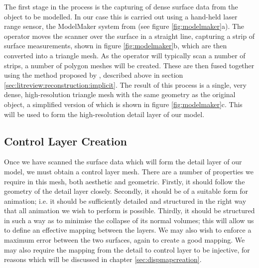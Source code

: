 The first stage in the process is the capturing of dense surface data from the object to be modelled. In our case this is carried out using a hand-held laser range sensor, the ModelMaker system from \citet{3DScanners} (see figure \ref{fig:modelmaker}a). The operator moves the scanner over the surface in a straight line, capturing a strip of surface measurements, shown in figure \ref{fig:modelmaker}b, which are then converted into a triangle mesh. As the operator will typically scan a number of strips, a number of polygon meshes will be created. These are then fused together using the method proposed by \citet{Hilton96b}, described above in section \ref{sec:litreview:reconstruction:implicit}. The result of this process is a single, very dense, high-resolution triangle mesh with the same geometry as the original object, a simplified version of which is shown in figure \ref{fig:modelmaker}c. This will be used to form the high-resolution detail layer of our model.

\subsection{\label{sec:scandata:creation:control}Control Layer Creation}
Once we have scanned the surface data which will form the detail layer of our model, we must obtain a control layer mesh. There are a number of properties we require in this mesh, both aesthetic and geometric. Firstly, it should follow the geometry of the detail layer closely. Secondly, it should be of a suitable form for animation; i.e. it should be sufficiently detailed and structured in the right way that all animation we wish to perform is possible. Thirdly, it should be structured in such a way as to minimise the collapse of its normal volumes; this will allow us to define an effective mapping between the layers. We may also wish to enforce a maximum error between the two surfaces, again to create a good mapping. We may also require the mapping from the detail to control layer to be injective, for reasons which will be discussed in chapter \ref{sec:dispmapcreation}.

